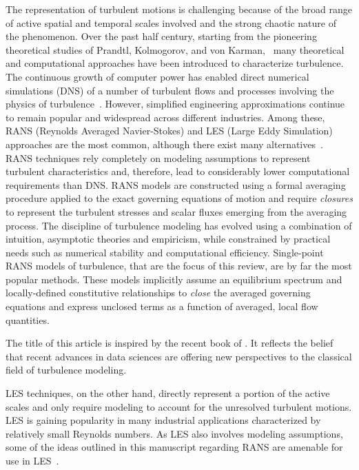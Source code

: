 \documentclass[a4paper]{ar-1col}
\begin{document}
The representation of turbulent motions is challenging because of the broad range of active spatial and temporal scales involved
and the strong chaotic nature of the phenomenon. Over the past half century, starting from the pioneering theoretical 
studies of Prandtl, Kolmogorov, and von Karman,~\citep{darrigol2005worlds} many theoretical and computational approaches have been introduced to characterize turbulence. The continuous growth of 
 computer power has enabled  direct numerical simulations (DNS) of a number of turbulent flows and processes involving the physics of turbulence~\citep{kim1987turbulence,rastegari2018common}.  However, simplified engineering approximations continue to remain 
 popular and widespread across different industries.
Among these, RANS (Reynolds Averaged Navier-Stokes) and
LES (Large Eddy Simulation) approaches are the most common, although there exist many alternatives~\citep{spalart2009detached-eddy,girimaji2006partially-averaged}. RANS techniques rely completely on modeling assumptions to 
represent turbulent characteristics and, therefore, lead to considerably lower computational requirements than DNS.  
RANS models are constructed using a formal averaging procedure
applied to the exact governing equations of motion and require {\it closures} to represent the turbulent stresses and scalar 
fluxes emerging from the averaging process.  The discipline of turbulence modeling has evolved using a combination of intuition,
asymptotic theories and empiricism, while constrained by practical needs such as numerical
stability and computational efficiency.
Single-point RANS models of turbulence, that are the focus of this review, are by far the most popular methods. These 
 models implicitly assume an equilibrium  spectrum and locally-defined constitutive relationships to {\it close} the averaged 
governing equations and express unclosed terms as a function of averaged, local flow quantities.

\begin{marginnote}[]
{The title of this article is inspired by the recent book of \citet{efron2016computer}. It reflects the belief that recent advances in data sciences are 
offering new perspectives to the classical field of turbulence modeling.}
\end{marginnote}


LES techniques, on the other hand, directly represent  a portion of the active scales and only require modeling  to account for 
the unresolved turbulent motions. LES is gaining popularity in many industrial applications characterized 
 by relatively small Reynolds numbers. As LES also involves modeling assumptions, some of the ideas outlined in 
this manuscript regarding RANS are amenable for use in LES~\citep{jofre2018framework, gamahara2017searching}.
\end{document}
